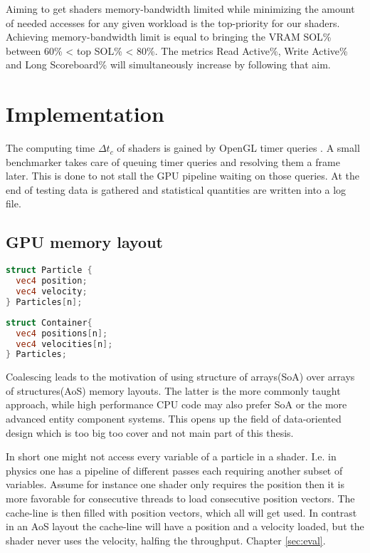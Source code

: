 \documentclass[m,times]{cgMA}
\begin{document}
Aiming to get shaders memory-bandwidth limited while minimizing the amount of needed accesses for any given workload is the top-priority for our shaders. Achieving memory-bandwidth limit is equal to bringing the VRAM SOL\% between 60\% < top SOL\% < 80\%. The metrics Read Active\%, Write Active\% and Long Scoreboard\% will simultaneously increase by following that aim.
\clearpage
\section{Implementation}\label{sec:implementation}
The computing time $\Delta t_c$ of shaders is gained by OpenGL timer queries \cite{KHRONOS:TIMER_QUERY}. A small benchmarker takes care of queuing timer queries and resolving them a frame later. This is done to not stall the GPU pipeline waiting on those queries. At the end of testing data is gathered and statistical quantities are written into a log file.
\subsection{GPU memory layout}
\noindent\begin{minipage}{0.45\textwidth}
\begin{lstlisting}[caption={AoS Layout},language={GLSL},style={GL}]
struct Particle {
  vec4 position;
  vec4 velocity;
} Particles[n];
\end{lstlisting}
\end{minipage}
\hfill\noindent\begin{minipage}{0.45\textwidth}
\begin{lstlisting}[caption={SoA Layout},label={llst:soa},language={GLSL},style={GL}]
struct Container{
  vec4 positions[n];
  vec4 velocities[n];
} Particles;
\end{lstlisting}
\end{minipage}

Coalescing leads to the motivation of using structure of arrays(SoA) over arrays of structures(AoS) memory layouts. The latter is the more commonly taught approach, while high performance CPU code may also prefer SoA or the more advanced entity component systems. This opens up the field of data-oriented design which is too big too cover and not main part of this thesis.

In short one might not access every variable of a particle in a shader. I.e. in physics one has a pipeline of different passes each requiring another subset of variables. Assume for instance one shader only requires the position then it is more favorable for consecutive threads to load consecutive position vectors. The cache-line is then filled with position vectors, which all will get used. In contrast in an AoS layout the cache-line will have a position and a velocity loaded, but the shader never uses the velocity, halfing the throughput. Chapter \ref{sec:eval}.
\end{document}
